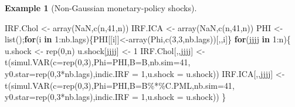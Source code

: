 \documentclass[
  12pt,
]{book}
\newenvironment{Shaded}{\begin{snugshade}}{\end{snugshade}}
\newcommand{\AttributeTok}[1]{\textcolor[rgb]{0.77,0.63,0.00}{#1}}
\newcommand{\ConstantTok}[1]{\textcolor[rgb]{0.00,0.00,0.00}{#1}}
\newcommand{\ControlFlowTok}[1]{\textcolor[rgb]{0.13,0.29,0.53}{\textbf{#1}}}
\newcommand{\DecValTok}[1]{\textcolor[rgb]{0.00,0.00,0.81}{#1}}
\newcommand{\FunctionTok}[1]{\textcolor[rgb]{0.00,0.00,0.00}{#1}}
\newcommand{\NormalTok}[1]{#1}
\newcommand{\OtherTok}[1]{\textcolor[rgb]{0.56,0.35,0.01}{#1}}
\newcommand{\SpecialCharTok}[1]{\textcolor[rgb]{0.00,0.00,0.00}{#1}}
\theoremstyle{definition}
\theoremstyle{definition}
\newtheorem{example}{Example}[chapter]
\theoremstyle{definition}
\theoremstyle{definition}
\theoremstyle{remark}
\begin{document}
\begin{example}[Non-Gaussian monetary-policy shocks]
\begin{Shaded}
\begin{Highlighting}[]
\NormalTok{IRF.Chol }\OtherTok{\textless{}{-}} \FunctionTok{array}\NormalTok{(}\ConstantTok{NaN}\NormalTok{,}\FunctionTok{c}\NormalTok{(n,}\DecValTok{41}\NormalTok{,n))}
\NormalTok{IRF.ICA  }\OtherTok{\textless{}{-}} \FunctionTok{array}\NormalTok{(}\ConstantTok{NaN}\NormalTok{,}\FunctionTok{c}\NormalTok{(n,}\DecValTok{41}\NormalTok{,n))}
\NormalTok{PHI }\OtherTok{\textless{}{-}} \FunctionTok{list}\NormalTok{();}\ControlFlowTok{for}\NormalTok{(i }\ControlFlowTok{in} \DecValTok{1}\SpecialCharTok{:}\NormalTok{nb.lags)\{PHI[[i]]}\OtherTok{\textless{}{-}}\FunctionTok{array}\NormalTok{(Phi,}\FunctionTok{c}\NormalTok{(}\DecValTok{3}\NormalTok{,}\DecValTok{3}\NormalTok{,nb.lags))[,,i]\}}
\ControlFlowTok{for}\NormalTok{(jjjj }\ControlFlowTok{in} \DecValTok{1}\SpecialCharTok{:}\NormalTok{n)\{}
\NormalTok{  u.shock }\OtherTok{\textless{}{-}} \FunctionTok{rep}\NormalTok{(}\DecValTok{0}\NormalTok{,n)}
\NormalTok{  u.shock[jjjj] }\OtherTok{\textless{}{-}} \DecValTok{1}
\NormalTok{  IRF.Chol[,,jjjj] }\OtherTok{\textless{}{-}} 
    \FunctionTok{t}\NormalTok{(}\FunctionTok{simul.VAR}\NormalTok{(}\AttributeTok{c=}\FunctionTok{rep}\NormalTok{(}\DecValTok{0}\NormalTok{,}\DecValTok{3}\NormalTok{),}\AttributeTok{Phi=}\NormalTok{PHI,}\AttributeTok{B=}\NormalTok{B,}\AttributeTok{nb.sim=}\DecValTok{41}\NormalTok{,}
                \AttributeTok{y0.star=}\FunctionTok{rep}\NormalTok{(}\DecValTok{0}\NormalTok{,}\DecValTok{3}\SpecialCharTok{*}\NormalTok{nb.lags),}\AttributeTok{indic.IRF =} \DecValTok{1}\NormalTok{,}\AttributeTok{u.shock =}\NormalTok{ u.shock))}
\NormalTok{  IRF.ICA[,,jjjj]  }\OtherTok{\textless{}{-}} 
    \FunctionTok{t}\NormalTok{(}\FunctionTok{simul.VAR}\NormalTok{(}\AttributeTok{c=}\FunctionTok{rep}\NormalTok{(}\DecValTok{0}\NormalTok{,}\DecValTok{3}\NormalTok{),}\AttributeTok{Phi=}\NormalTok{PHI,}\AttributeTok{B=}\NormalTok{B}\SpecialCharTok{\%*\%}\NormalTok{C.PML,}\AttributeTok{nb.sim=}\DecValTok{41}\NormalTok{,}
                \AttributeTok{y0.star=}\FunctionTok{rep}\NormalTok{(}\DecValTok{0}\NormalTok{,}\DecValTok{3}\SpecialCharTok{*}\NormalTok{nb.lags),}\AttributeTok{indic.IRF =} \DecValTok{1}\NormalTok{,}\AttributeTok{u.shock =}\NormalTok{ u.shock))}
\NormalTok{\}}
\end{Highlighting}
\end{Shaded}


\end{example}
\end{document}
